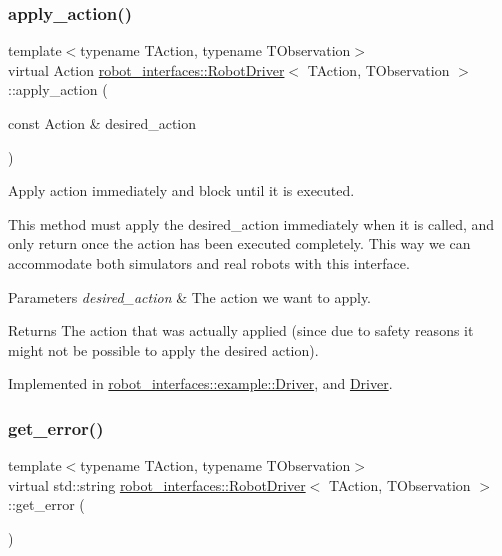 \subsubsection{\texorpdfstring{apply\+\_\+action()}{apply\_action()}}
{\footnotesize\ttfamily template$<$typename T\+Action, typename T\+Observation$>$ \\
virtual Action \hyperlink{classrobot__interfaces_1_1RobotDriver}{robot\+\_\+interfaces\+::\+Robot\+Driver}$<$ T\+Action, T\+Observation $>$\+::apply\+\_\+action (\begin{DoxyParamCaption}\item[{const Action \&}]{desired\+\_\+action }\end{DoxyParamCaption})\hspace{0.3cm}{\ttfamily [pure virtual]}}



Apply action immediately and block until it is executed. 

This method must apply the desired\+\_\+action immediately when it is called, and only return once the action has been executed completely. This way we can accommodate both simulators and real robots with this interface.


\begin{DoxyParams}{Parameters}
{\em desired\+\_\+action} & The action we want to apply. \\
\hline
\end{DoxyParams}
\begin{DoxyReturn}{Returns}
The action that was actually applied (since due to safety reasons it might not be possible to apply the desired action). 
\end{DoxyReturn}


Implemented in \hyperlink{classrobot__interfaces_1_1example_1_1Driver_aa18b1bc90441395e86794a90dfdac9fa}{robot\+\_\+interfaces\+::example\+::\+Driver}, and \hyperlink{classDriver_a0f8d51bef151ccc38a0cb7b226048e28}{Driver}.

\mbox{\label{classrobot__interfaces_1_1RobotDriver_acdf4c5d6993b836a180e6b6fc12b3445}} 
\subsubsection{\texorpdfstring{get\+\_\+error()}{get\_error()}}
{\footnotesize\ttfamily template$<$typename T\+Action, typename T\+Observation$>$ \\
virtual std\+::string \hyperlink{classrobot__interfaces_1_1RobotDriver}{robot\+\_\+interfaces\+::\+Robot\+Driver}$<$ T\+Action, T\+Observation $>$\+::get\+\_\+error (\begin{DoxyParamCaption}{ }\end{DoxyParamCaption})\hspace{0.3cm}{\ttfamily [pure virtual]}}



